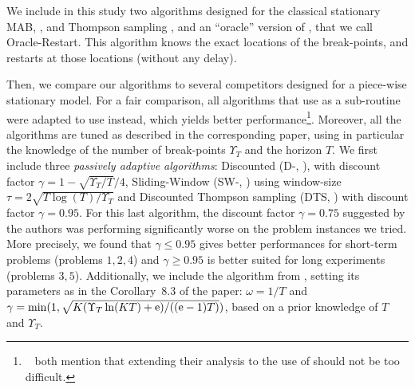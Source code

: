 We include in this study two algorithms designed for the classical stationary MAB, \klUCB{} \cite{Garivier11KL}, and Thompson sampling \cite{AgrawalGoyal11,Kaufmann12Thompson},
and an ``oracle'' version of \klUCB, that we call Oracle-Restart. This algorithm knows the exact locations of the break-points, and restarts \klUCB{} at those locations (without any delay).

Then, we compare our algorithms to several competitors designed for a piece-wise stationary model. For a fair comparison, all algorithms that use  \UCB{} as a sub-routine were adapted to use \klUCB{} instead, which yields better performance\footnote{~\cite{LiuLeeShroff17,CaoZhenKvetonXie18} both mention that extending their analysis to the use of \klUCB{} should not be too difficult.}. Moreover, all the algorithms are tuned as described in the corresponding paper, using in particular the knowledge of the number of break-points $\Upsilon_T$ and the horizon $T$. We first include three \emph{passively adaptive algorithms}:
Discounted \klUCB{} (D-\klUCB, \cite{Kocsis06}), with discount factor $\gamma = 1 - \sqrt{\Upsilon_T/T}/4$, Sliding-Window \klUCB{} (SW-\klUCB,  \cite{Garivier11UCBDiscount}) using window-size $\tau = 2 \sqrt{T\log(T)/\Upsilon_T}$ and Discounted Thompson sampling (DTS, \cite{RajKalyani17}) with discount factor $\gamma = 0.95$. For this last algorithm, the discount factor $\gamma=0.75$ suggested by the authors was performing significantly worse on the problem instances we tried.
More precisely, we found that $\gamma\leq0.95$ gives better performances for short-term problems (problems $1,2,4$) and $\gamma\geq0.95$ is better suited for long experiments (problems $3,5$).
%
%
Additionally, we include the \ExpThreeS{} algorithm from \cite{Auer02NonStochastic}, setting its parameters as in the Corollary~8.3 of the paper: $\omega=1/T$ and $\gamma = \min(1, \sqrt{K (\Upsilon_T \ln(KT) + \mathrm{e}) / ((\mathrm{e}-1)T)})$, based on a prior knowledge of $T$ and $\Upsilon_T$.


